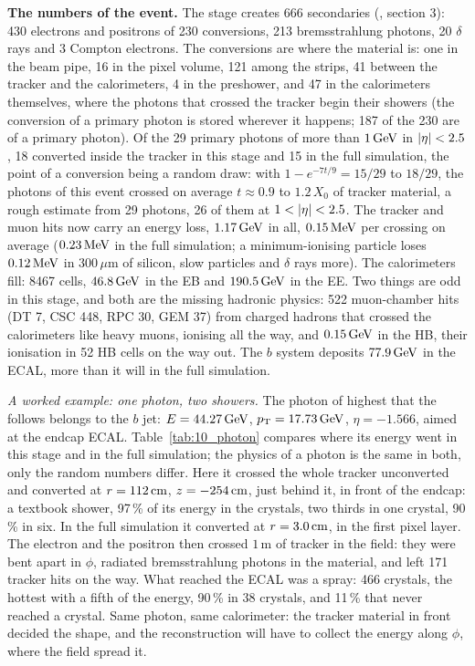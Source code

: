 \textbf{The numbers of the event.} The stage creates 666 secondaries (, section 3): 430
electrons and positrons of 230 conversions, 213 bremsstrahlung photons, 20 $\delta$ rays and 3 Compton electrons. The
conversions are where the material is: one in the beam pipe, 16 in the pixel volume, 121 among the strips, 41
between the tracker and the calorimeters, 4 in the preshower, and 47 in the calorimeters themselves, where the photons
that crossed the tracker begin their showers (the conversion of a primary photon is stored wherever it happens; 187
of the 230 are of a primary photon). Of the 29 primary photons of more than $1\,\mathrm{GeV}$ in $|\eta|<2.5$, 18 converted
inside the tracker in this stage and 15 in the full simulation, the point of a conversion being a random draw: with
$1-e^{-7t/9}=15/29$ to $18/29$, the photons of this event crossed on average $t\approx0.9$ to $1.2\,X_0$ of tracker
material, a rough estimate from 29 photons, 26 of them at $1<\abseta<2.5$. The tracker and muon hits now carry an
energy loss, $1.17\,\mathrm{GeV}$ in all, $0.15\,\mathrm{MeV}$ per crossing on average ($0.23\,\mathrm{MeV}$ in the full simulation; a
minimum-ionising particle loses $0.12\,\mathrm{MeV}$ in $300\,\mu$m of silicon, slow particles and $\delta$ rays more). The calorimeters fill: 8467 cells, $46.8\,\mathrm{GeV}$ in the EB and $190.5\,\mathrm{GeV}$ in the EE. Two things are odd in
this stage, and both are the missing hadronic physics: 522 muon-chamber hits (DT 7, CSC 448, RPC 30, GEM 37) from
charged hadrons that crossed the calorimeters like heavy muons, ionising all the way, and $0.15\,\mathrm{GeV}$ in the HB, their
ionisation in 52 HB cells on the way out. The $b$ system deposits $77.9\,\mathrm{GeV}$ in the ECAL, more than it will
in the full simulation.

\emph{A worked example: one photon, two showers.} The photon of highest \pt{} that the 
follows belongs to the $b$ jet: $E=44.27\,\mathrm{GeV}$, $p_{\mathrm{T}}=17.73\,\mathrm{GeV}$, $\eta=-1.566$, aimed at the endcap ECAL.
Table~\ref{tab:10_photon} compares where its energy went in this stage and in the full simulation; the physics of a
photon is the same in both, only the random numbers differ. Here it crossed the whole tracker unconverted and
converted at $r=112\,\mathrm{cm}$, $z=-254\,\mathrm{cm}$, just behind it, in front of the endcap: a textbook shower, 97\,\% of its energy in the
crystals, two thirds in one crystal, 90\,\% in six. In the full simulation it converted at $r=3.0\,\mathrm{cm}$, in the first
pixel layer. The electron and the positron then crossed $1$\,m of tracker in the field: they were bent apart in
$\phi$, radiated bremsstrahlung photons in the material, and left 171 tracker hits on the way. What reached the ECAL
was a spray: 466 crystals, the hottest with a fifth of the energy, 90\,\% in 38 crystals, and 11\,\% that never
reached a crystal. Same photon, same calorimeter: the tracker material in front decided the shape, and the
reconstruction will have to collect the energy along $\phi$, where the field spread it.

